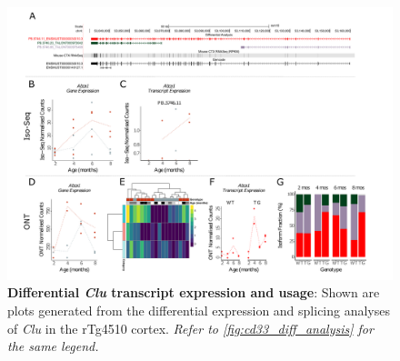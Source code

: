 \begin{landscape}
	\begin{figure}[htp]
		\begin{center}
			\includegraphics[page=8,trim={0 0.5cm 0 1.5cm},scale =0.85]{Figures/TargetGene_DifferentialAnalysis.pdf}
		\end{center}
		\captionsetup{width=1.5\textwidth}
		\caption[Differential \textit{Clu} transcript expression and usage]%
		{\textbf{Differential \textit{Clu} transcript expression and usage}: Shown are plots generated from the differential expression and splicing analyses of \textit{Clu} in the rTg4510 cortex. \textit{Refer to \cref{fig:cd33_diff_analysis} for the same legend.}}   
		\label{fig:Clu_diff_analysis}
	\end{figure}
\end{landscape}

